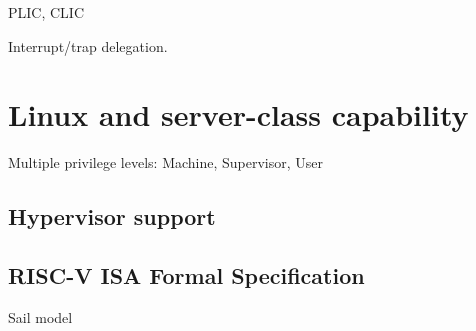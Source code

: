 PLIC, CLIC

Interrupt/trap delegation.


\section{Linux and server-class capability}

Multiple privilege levels: Machine, Supervisor, User

\subsection{Hypervisor support}


\subsection{RISC-V ISA Formal Specification}

Sail model

